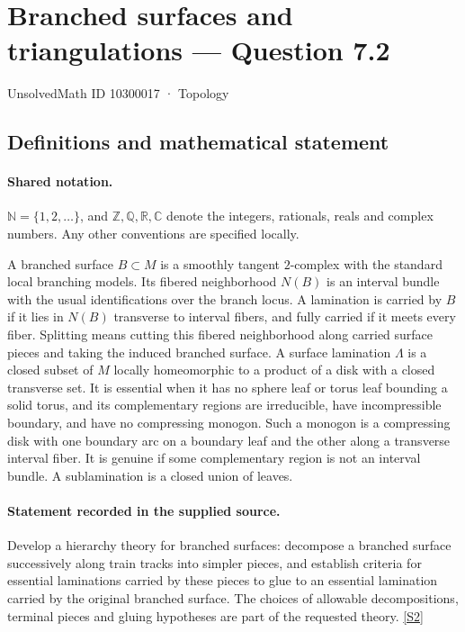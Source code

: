 \documentclass[11pt]{article}
\newcommand{\sref}[2]{\hyperlink{source:#1:#2}{[S#2]}}
\begin{document}
\setcounter{section}{10300016}
\section{Branched surfaces and triangulations — Question 7.2}\label{10300017}
{\small\sffamily UnsolvedMath ID 10300017 · Topology}
\subsection{Definitions and mathematical statement}

\paragraph{Shared notation.}$\mathbb N=\{1,2,\ldots\}$, and $\mathbb Z,\mathbb Q,\mathbb R,\mathbb C$ denote the integers, rationals, reals and complex numbers. Any other conventions are specified locally.


A branched surface $B\subset M$ is a smoothly tangent $2$-complex with the standard local branching models. Its fibered neighborhood $N(B)$ is an interval bundle with the usual identifications over the branch locus. A lamination is carried by $B$ if it lies in $N(B)$ transverse to interval fibers, and fully carried if it meets every fiber. Splitting means cutting this fibered neighborhood along carried surface pieces and taking the induced branched surface. A surface lamination $\Lambda$ is a closed subset of $M$ locally homeomorphic to a product of a disk with a closed transverse set. It is essential when it has no sphere leaf or torus leaf bounding a solid torus, and its complementary regions are irreducible, have incompressible boundary, and have no compressing monogon. Such a monogon is a compressing disk with one boundary arc on a boundary leaf and the other along a transverse interval fiber. It is genuine if some complementary region is not an interval bundle. A sublamination is a closed union of leaves.
\paragraph{Statement recorded in the supplied source.}
Develop a hierarchy theory for branched surfaces: decompose a branched surface successively along train tracks into simpler pieces, and establish criteria for essential laminations carried by these pieces to glue to an essential lamination carried by the original branched surface. The choices of allowable decompositions, terminal pieces and gluing hypotheses are part of the requested theory. \sref{10300017}{2}
\end{document}
